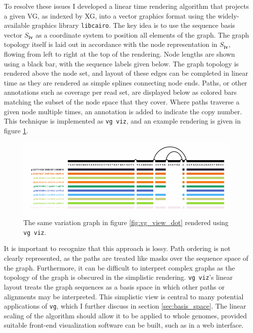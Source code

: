 To resolve these issues I developed a linear time rendering algorithm that projects a given VG, as indexed by XG, into a vector graphics format using the widely-available graphics library {\tt libcairo}.
The key idea is to use the sequence basis vector $S_\textbf{iv}$ as a coordinate system to position all elements of the graph.
The graph topology itself is laid out in accordance with the node representation in $S_\textbf{iv}$, flowing from left to right at the top of the rendering.
Node lengths are shown using a black bar, with the sequence labels given below.
The graph topology is rendered above the node set, and layout of these edges can be completed in linear time as they are rendered as simple splines connecting node ends.
Paths, or other annotations such as coverage per read set, are displayed below as colored bars matching the subset of the node space that they cover.
Where paths traverse a given node multiple times, an annotation is added to indicate the copy number.
This technique is implemented as {\tt vg viz}, and an example rendering is given in figure \ref{fig:vg_viz}.

\begin{figure}[htbp!] 
\centering    
\includegraphics[width=1.0\textwidth]{Chapter2/Figs/vg_viz_H-3136.pdf}
\caption[Linearized variation graph visualization]{The same variation graph in figure \ref{fig:vg_view_dot} rendered using {\tt vg viz}.}
\label{fig:vg_viz}
\end{figure}

It is important to recognize that this approach is lossy.
Path ordering is not clearly represented, as the paths are treated like masks over the sequence space of the graph.
Furthermore, it can be difficult to interpret complex graphs as the topology of the graph is obscured in the simplistic rendering.
{\tt vg viz}'s linear layout treats the graph sequences as a basis space in which other paths or alignments may be interpreted.
This simplistic view is central to many potential applications of {\tt vg}, which I further discuss in section \ref{sec:basis_space}.
The linear scaling of the algorithm should allow it to be applied to whole genomes, provided suitable front-end visualization software can be built, such as in a web interface.

